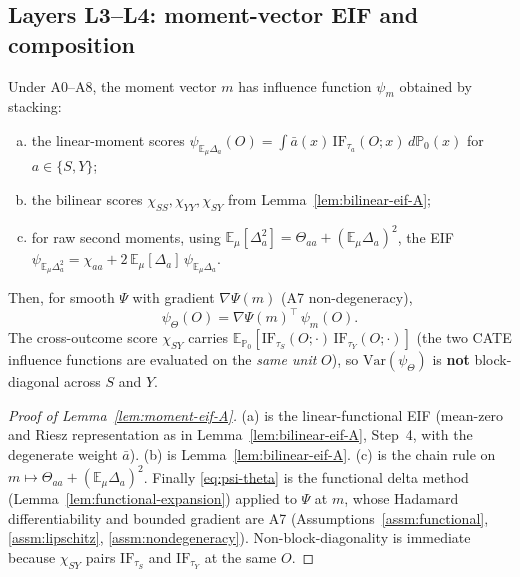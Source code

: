 \subsection{Layers L3--L4: moment-vector EIF and composition}

\begin{lemma}
\label{lem:moment-eif-A}
Under A0--A8, the moment vector $m$ has influence function $\psi_m$ obtained by stacking:
\begin{enumerate}[(a)]
\item the linear-moment scores
$\psi_{\mathbb{E}_\mu\Delta_a}(O)=\int\bar a(x)\,\mathrm{IF}_{\tau_a}(O;x)\,d\mathbb{P}_0(x)$
for $a\in\{S,Y\}$;
\item the bilinear scores $\chi_{SS},\chi_{YY},\chi_{SY}$ from Lemma~\ref{lem:bilinear-eif-A};
\item for raw second moments, using $\mathbb{E}_\mu[\Delta_a^2]=\Theta_{aa}+(\mathbb{E}_\mu\Delta_a)^2$, the EIF
$\psi_{\mathbb{E}_\mu\Delta_a^2}=\chi_{aa}+2\,\mathbb{E}_\mu[\Delta_a]\,\psi_{\mathbb{E}_\mu\Delta_a}$.
\end{enumerate}
Then, for smooth $\Psi$ with gradient $\nabla\Psi(m)$ (A7 non-degeneracy),
\begin{equation}
\psi_\Theta(O) = \nabla\Psi(m)^\top\,\psi_m(O).
\label{eq:psi-theta}
\end{equation}
The cross-outcome score $\chi_{SY}$ carries
$\mathbb{E}_{\mathbb{P}_0}[\mathrm{IF}_{\tau_S}(O;\cdot)\,\mathrm{IF}_{\tau_Y}(O;\cdot)]$
(the two CATE influence functions are evaluated on the \emph{same unit} $O$), so
$\mathrm{Var}(\psi_\Theta)$ is \textbf{not} block-diagonal across $S$ and $Y$.
\end{lemma}

\begin{proof}[Proof of Lemma~\ref{lem:moment-eif-A}]
(a) is the linear-functional EIF (mean-zero and Riesz representation as in
Lemma~\ref{lem:bilinear-eif-A}, Step~4, with the degenerate weight $\bar a$). (b) is
Lemma~\ref{lem:bilinear-eif-A}. (c) is the chain rule on
$m\mapsto\Theta_{aa}+(\mathbb{E}_\mu\Delta_a)^2$. Finally \eqref{eq:psi-theta} is the functional
delta method (Lemma~\ref{lem:functional-expansion}) applied to $\Psi$ at $m$, whose Hadamard
differentiability and bounded gradient are A7 (Assumptions~\ref{assm:functional},
\ref{assm:lipschitz}, \ref{assm:nondegeneracy}). Non-block-diagonality is immediate because
$\chi_{SY}$ pairs $\mathrm{IF}_{\tau_S}$ and $\mathrm{IF}_{\tau_Y}$ at the same $O$.
\end{proof}

